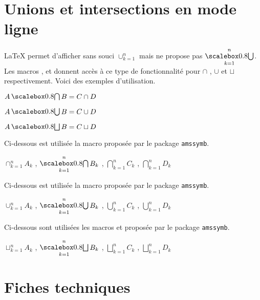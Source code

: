 \documentclass[12pt,a4paper]{article}
\begin{document}
\section{Unions et intersections en mode ligne}

\LaTeX{} permet d'afficher sans souci $\cup_{k=1}^{n}$ mais ne propose pas $\dcup_{k=1}^{n}$.
Les macros ,  et  donnent accès à ce type de fonctionnalité pour $\cap$ , $\cup$ et $\sqcup$ respectivement.
Voici des exemples d'utilisation.





\begin{latexex}
$A \dcap B = C \cap D$

$A \dcup B = C \cup D$

$A \dsqcup B = C \sqcup D$
\end{latexex}





Ci-dessous est utilisée la macro  proposée par le package \verb+amssymb+.

\begin{latexex}
$\cap_{k=1}^{n}    A_k$ ,
$\dcap_{k=1}^{n}   B_k$ ,
$\bigcap_{k=1}^{n} C_k$ ,
$\displaystyle%
 \bigcap_{k=1}^{n} D_k$
\end{latexex}





Ci-dessous est utilisée la macro  proposée par le package \verb+amssymb+.

\begin{latexex}
$\cup_{k=1}^{n}    A_k$ ,
$\dcup_{k=1}^{n}   B_k$ ,
$\bigcup_{k=1}^{n} C_k$ ,
$\displaystyle%
 \bigcup_{k=1}^{n} D_k$
\end{latexex}





Ci-dessous sont utilisées les macros  et  proposée par le package \verb+amssymb+.

\begin{latexex}
$\sqcup_{k=1}^{n}    A_k$ ,
$\dsqcup_{k=1}^{n}   B_k$ ,
$\bigsqcup_{k=1}^{n} C_k$ ,
$\displaystyle%
 \bigsqcup_{k=1}^{n} D_k$
\end{latexex}




\section{Fiches techniques}



\end{document}
